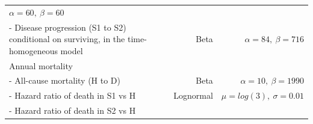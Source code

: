 \documentclass[]{article}
\begin{document}
\begin{longtable}[]{@{}lrr@{}}
\begin{minipage}[t]{0.42\columnwidth}
\(\alpha=60, \ \beta=60\)\strut
\end{minipage}\tabularnewline
\begin{minipage}[t]{0.32\columnwidth}\raggedright\strut
- Disease progression (S1 to S2) conditional on surviving, in the
time-homogeneous model\strut
\end{minipage} & \begin{minipage}[t]{0.17\columnwidth}\raggedleft\strut
Beta\strut
\end{minipage} & \begin{minipage}[t]{0.42\columnwidth}\raggedleft\strut
\(\alpha=84, \ \beta=716\)\strut
\end{minipage}\tabularnewline
\begin{minipage}[t]{0.32\columnwidth}\raggedright\strut
Annual mortality\strut
\end{minipage} & \begin{minipage}[t]{0.17\columnwidth}\raggedleft\strut
\strut
\end{minipage} & \begin{minipage}[t]{0.42\columnwidth}\raggedleft\strut
\strut
\end{minipage}\tabularnewline
\begin{minipage}[t]{0.32\columnwidth}\raggedright\strut
- All-cause mortality (H to D)\strut
\end{minipage} & \begin{minipage}[t]{0.17\columnwidth}\raggedleft\strut
Beta\strut
\end{minipage} & \begin{minipage}[t]{0.42\columnwidth}\raggedleft\strut
\(\alpha=10, \ \beta=1990\)\strut
\end{minipage}\tabularnewline
\begin{minipage}[t]{0.32\columnwidth}\raggedright\strut
- Hazard ratio of death in S1 vs H\strut
\end{minipage} & \begin{minipage}[t]{0.17\columnwidth}\raggedleft\strut
Lognormal\strut
\end{minipage} & \begin{minipage}[t]{0.42\columnwidth}\raggedleft\strut
\(\mu = log(3), \ \sigma = 0.01\)\strut
\end{minipage}\tabularnewline
\begin{minipage}[t]{0.32\columnwidth}\raggedright\strut
- Hazard ratio of death in S2 vs H\strut
\end{minipage} & \begin{minipage}[t]{0.17\columnwidth}\raggedleft\strut

\end{minipage}
\end{longtable}
\end{document}
